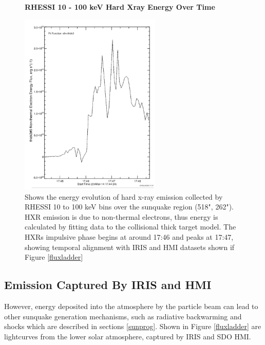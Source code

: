 \begin{figure}[H]
  \begin{center}
  \textbf{RHESSI 10 - 100 keV Hard Xray Energy Over Time}\par\medskip
  \includegraphics[width=0.6\textwidth]{rhessi-energy-curve}
  \end{center}
  \caption{Shows the energy evolution of hard x-ray emission collected by RHESSI 10 to 100 keV bins over the sunquake region (518", 262"). HXR emission is due to non-thermal electrons, thus energy is calculated by fitting data to the collisional thick target model. The HXRs impulsive phase begins at around 17:46 and peaks at 17:47, showing temporal alignment with IRIS and HMI datasets shown if Figure \ref{fluxladder}}\label{erhessi}
\end{figure}

\subsection{Emission Captured By IRIS and HMI}
However, energy deposited into the atmosphere by the particle beam can lead to other sunquake generation mechanisms, such as radiative backwarming and shocks which are described in sections \ref{sunprog}. Shown in Figure \ref{fluxladder} are lightcurves from the lower solar atmosphere, captured by IRIS and SDO HMI.    






